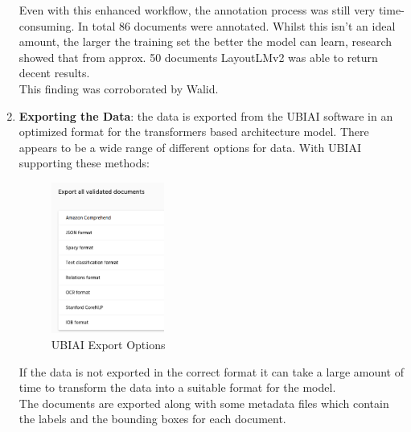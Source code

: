 \begin{enumerate}
	      Even with this enhanced workflow, the annotation process was still very time-consuming. In total 86 documents
	      were annotated. Whilst this isn't an ideal amount, the larger the training set the better the model can
	      learn, research showed that from approx. 50 documents LayoutLMv2 was able to return decent results.\\
	      This finding was corroborated by Walid.
	\item \textbf{Exporting the Data}: the data is exported from the UBIAI software in an optimized format for the transformers
	      based architecture model. There appears to be a wide range of different options for data. With UBIAI supporting these methods:
	      \begin{figure}[H]
		      \centering
		      \includegraphics[width=0.35\textwidth]{figures/ubiai_export_options.png}
		      \caption{UBIAI Export Options}
		      \label{fig:ubiai_export_options}
	      \end{figure}
	      If the data is not exported in the correct format it can take a large amount of time to transform the data into a
	      suitable format for the model.\\
	      The documents are exported along with some metadata files which contain the labels and the bounding boxes for each
	      document.
\end{enumerate}
